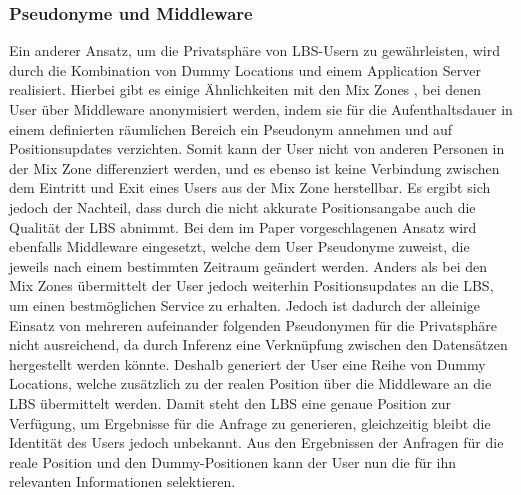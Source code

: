 \subsubsection{Pseudonyme und Middleware \cite{Sahu2012}} \label{subsubsection:pseudomiddle}
Ein anderer Ansatz, um die Privatsphäre von LBS-Usern zu gewährleisten, wird durch die Kombination von Dummy Locations und einem Application Server realisiert. Hierbei gibt es einige Ähnlichkeiten mit den Mix Zones \cite{Beresford2003}, bei denen User über Middleware anonymisiert werden, indem sie für die Aufenthaltsdauer in einem definierten räumlichen Bereich ein Pseudonym annehmen und auf Positionsupdates verzichten. Somit kann der User nicht von anderen Personen in der Mix Zone differenziert werden, und es ebenso ist keine Verbindung zwischen dem Eintritt und Exit eines Users aus der Mix Zone herstellbar. Es ergibt sich jedoch der Nachteil, dass durch die nicht akkurate Positionsangabe auch die Qualität der LBS abnimmt. 
Bei dem im Paper vorgeschlagenen Ansatz wird ebenfalls Middleware eingesetzt, welche dem User Pseudonyme zuweist, die jeweils nach einem bestimmten Zeitraum geändert werden. Anders als bei den Mix Zones übermittelt der User jedoch weiterhin Positionsupdates an die LBS, um einen bestmöglichen Service zu erhalten. Jedoch ist dadurch der alleinige Einsatz von mehreren aufeinander folgenden Pseudonymen für die Privatsphäre nicht ausreichend, da durch Inferenz eine Verknüpfung zwischen den Datensätzen hergestellt werden könnte. Deshalb generiert der User eine Reihe von Dummy Locations, welche zusätzlich zu der realen Position über die Middleware an die LBS übermittelt werden. Damit steht den LBS eine genaue Position zur Verfügung, um Ergebnisse für die Anfrage zu generieren, gleichzeitig bleibt die Identität des Users jedoch unbekannt. Aus den Ergebnissen der Anfragen für die reale Position und den Dummy-Positionen kann der User nun die für ihn relevanten Informationen selektieren.
